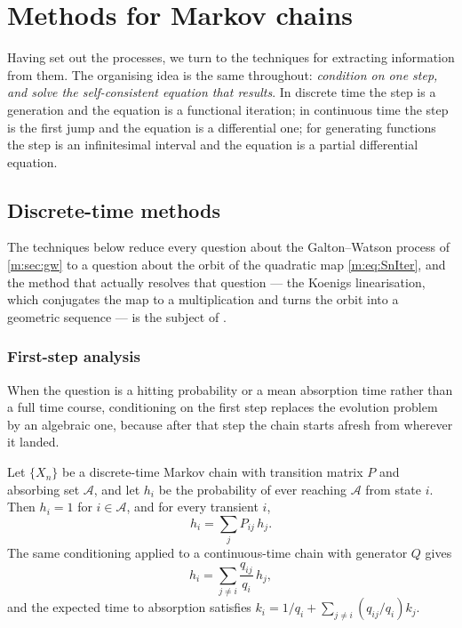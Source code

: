 \section{Methods for Markov chains}
\label{m:sec:methods}

Having set out the processes, we turn to the techniques for extracting information
from them. The organising idea is the same throughout: \emph{condition on one step,
and solve the self-consistent equation that results}. In discrete time the step is
a generation and the equation is a functional iteration; in continuous time the
step is the first jump and the equation is a differential one; for generating
functions the step is an infinitesimal interval and the equation is a partial
differential equation.

\subsection{Discrete-time methods}
\label{m:sec:dtmethods}

The techniques below reduce every question about the Galton--Watson process of
\cref{m:sec:gw} to a question about the orbit of the quadratic map
\cref{m:eq:SnIter}, and the method that actually resolves that question --- the
Koenigs linearisation, which conjugates the map to a multiplication and turns the
orbit into a geometric sequence --- is the subject of \ChA.

\subsubsection{First-step analysis}
\label{m:sec:firststep}

When the question is a hitting probability or a mean absorption time rather than a
full time course, conditioning on the first step replaces the evolution problem by
an algebraic one, because after that step the chain starts afresh from wherever it
landed.

\begin{proposition}
\label{m:prop:firststep}
Let $\{X_n\}$ be a discrete-time Markov chain with transition matrix $P$ and
absorbing set $\mathcal A$, and let $h_i$ be the probability of ever reaching
$\mathcal A$ from state $i$. Then $h_i=1$ for $i\in\mathcal A$, and for every
transient $i$,
\begin{equation}
\label{m:eq:firststepdiscrete}
h_i = \sum_{j}P_{ij}\,h_j .
\end{equation}
The same conditioning applied to a continuous-time chain with generator $Q$ gives
\begin{equation}
\label{m:eq:firststep}
h_i = \sum_{j\neq i}\frac{q_{ij}}{q_i}\,h_j ,
\end{equation}
and the expected time to absorption satisfies
$k_i = 1/q_i + \sum_{j\neq i}(q_{ij}/q_i)k_j$.
\end{proposition}

